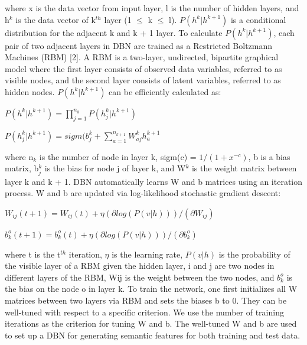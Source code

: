 \documentclass{article}
\begin{document}
where x is the data vector from input layer, l is the number of hidden layers, and h$^k$ is the data vector of k$^{th}$ layer (1 $\leq$ k $\leq$ l). $P(h^k|h^{k+1})$ is a conditional distribution for the adjacent k and k + 1 layer. To calculate $P(h^k|h^{k+1})$, each pair of two adjacent layers in DBN are trained as a Restricted Boltzmann Machines (RBM) [2]. A RBM is a two-layer, undirected, bipartite graphical model where the first layer consists of observed data variables, referred to as visible nodes, and the second layer consists of latent variables, referred to as hidden nodes. $P(h^k|h^{k+1})$ can be efficiently calculated as:

\begin{math}
P(h^k|h^{k+1}) = \prod_{j=1}^{n_k} P(h^k_j|h^{k+1})
\end{math}

\begin{math}
P(h^k_j|h^{k+1}) = sigm(b_j^k + \sum_{a=1}^{n_{k+1}} W^k_{aj}h^{k+1}_a
\end{math} 

where n$_k$ is the number of node in layer k, sigm(c) = $1/(1+x^{-c})$, b is a bias matrix, b$^k_j$ is the bias for node j of layer k, and W$^k$ is the weight matrix between layer k and k + 1.
DBN automatically learns W and b matrices using an iteration process. W and b are updated via log-likelihood stochastic gradient descent:

\begin{math}
W_{ij}(t+1) = W_{ij}(t) + \eta(\partial log(P(v|h)))/(\partial W_{ij})
\end{math}

\begin{math}
b_k^o(t+1) = b_k^o(t) + \eta(\partial log(P(v|h)))/(\partial b_k^o)
\end{math}

where t is the t$^{th}$ iteration, $\eta$ is the learning rate, $P(v|h)$ is the probability of the visible layer of a RBM given the hidden layer, i and j are two nodes in different layers of the RBM, Wij is the weight between the two nodes, and $b_k^o$ is the bias on the node o in layer k. To train the network, one first initializes all W matrices between two layers via RBM and sets the biases b to 0. They can be well-tuned with respect to a specific criterion. We use the number of training iterations as the criterion for tuning W and b. The well-tuned W and b are used to set up a DBN for generating semantic features for both training and test data.
\end{document}
